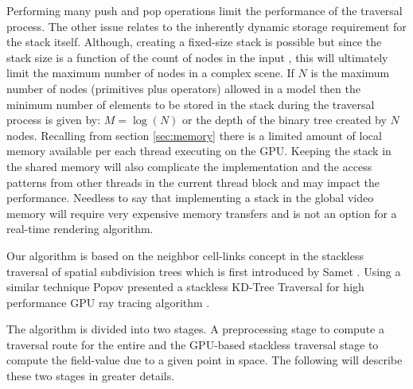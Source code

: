 Performing many push and pop operations limit the performance of the traversal process. The other issue relates to the 
inherently dynamic storage requirement for the stack itself. Although, creating a fixed-size stack is possible but since the stack size is a function of
the count of nodes in the input \blob, this will ultimately limit the maximum number of nodes in a complex scene. If $N$ is the maximum number of nodes 
(primitives plus operators) allowed in a \blob model then the minimum number of elements to be stored in the stack during the traversal process 
is given by: $M=\log(N)$ or the depth of the binary tree created by $N$ nodes. Recalling from section \ref{sec:memory} there is a limited amount of
local memory available per each thread executing on the GPU. Keeping the stack in the shared memory will also complicate the implementation and
the access patterns from other threads in the current thread block and may impact the performance. Needless to say that implementing a stack in the global 
video memory will require very expensive memory transfers and is not an option for a real-time rendering algorithm. 


Our algorithm is based on the neighbor cell-links concept in the stackless traversal of spatial subdivision trees 
which is first introduced by Samet \etal \cite{Samet1984,Samet1990}. Using a similar technique Popov \etal presented 
a stackless KD-Tree Traversal for high performance GPU ray tracing algorithm \cite{Popov2007}. 


The algorithm is divided into two stages. A preprocessing stage to compute a traversal route for the entire 
\blob and the GPU-based stackless traversal stage to compute the field-value due to a given point in space. 
The following will describe these two stages in greater details.


